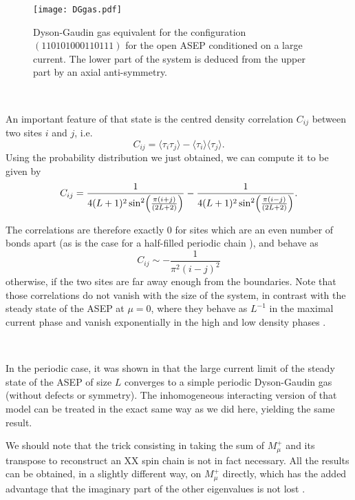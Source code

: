 \documentclass[aps,pre,onecolumn,showpacs,showkeys,a4paper]{revtex4-1}
\begin{document}
 \begin{figure}[ht]
\begin{center}
 \texttt{[image: DGgas.pdf]}
  \caption{Dyson-Gaudin gas equivalent for the configuration $(110101000110111)$ for the open ASEP conditioned on a large current. The lower part of the system is deduced from the upper part by an axial anti-symmetry.}
\label{fig-DGgas}
 \end{center}
 \end{figure}

~

An important feature of that state is the centred density correlation $C_{ij}$ between two sites $i$ and $j$, i.e.
\begin{equation}
C_{ij}=\langle\tau_i\tau_j\rangle-\langle\tau_i\rangle\langle\tau_j\rangle.
\end{equation}
Using the probability distribution we just obtained, we can compute it to be given by
\begin{equation}
C_{ij}=\frac{1}{4(L+1)^2\sin^2\Bigl(\frac{\pi(i+j)}{(2L+2)}\Bigr)}-\frac{1}{4(L+1)^2\sin^2\Bigl(\frac{\pi(i-j)}{(2L+2)}\Bigr)}.
\end{equation}

The correlations are therefore exactly $0$ for sites which are an even number of bonds apart (as is the case for a half-filled periodic chain \cite{Popkov2010}), and behave as
\begin{equation}\boxed{
C_{ij}\sim -\frac{1}{\pi^2 (i-j)^2}
}\end{equation}
otherwise, if the two sites are far away enough from the boundaries. Note that those correlations do not vanish with the size of the system, in contrast with the steady state of the ASEP at $\mu=0$, where they behave as $L^{-1}$ in the maximal current phase and vanish exponentially in the high and low density phases \cite{Derrida1993a}.


~

In the periodic case, it was shown in \cite{Popkov2010} that the large current limit of the steady state of the ASEP of size $L$ converges to a simple periodic Dyson-Gaudin gas (without defects or symmetry). The inhomogeneous interacting version of that model can be treated in the exact same way as we did here, yielding the same result.

We should note that the trick consisting in taking the sum of $M^+_\mu$ and its transpose to reconstruct an XX spin chain is not in fact necessary. All the results can be obtained, in a slightly different way, on $M^+_\mu$ directly, which has the added advantage that the imaginary part of the other eigenvalues is not lost \cite{Karevski2016}.
\end{document}
